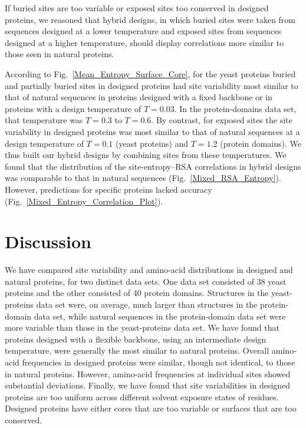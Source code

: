 \documentclass[12pt]{article}
\begin{document}
If buried sites are too variable or exposed sites too conserved in designed proteins, we reasoned that hybrid designs, in which buried sites were taken from sequences designed at a lower temperature and exposed sites from sequences designed at a higher temperature, should display correlations more similar to those seen in natural proteins. 

According to Fig.~\ref{Mean_Entropy_Surface_Core}, for the yeast proteins buried and partially buried sites in designed proteins had site variability most similar to that of natural sequences in proteins designed with a fixed backbone or in proteins with a design temperature of $T=0.03$. In the protein-domains data set, that temperature was $T=0.3$ to $T = 0.6$.  By contrast, for exposed sites the site variability in designed proteins was most similar to that of natural sequences at a design temperature of $T= 0.1$ (yeast proteins) and $T  = 1.2$ (protein domains).  We thus built our hybrid designs by combining sites from these temperatures. We found that the distribution of the site-entropy--RSA correlations in hybrid designs was comparable to that in natural sequences (Fig.~\ref{Mixed_RSA_Entropy}). However, predictions for specific proteins lacked accuracy (Fig.~\ref{Mixed_Entropy_Correlation_Plot}).

\section{Discussion}

We have compared site variability and amino-acid distributions in designed and natural proteins, for two distinct data sets. One data set consisted of 38 yeast proteins and the other consisted of 40 protein domains. Structures in the yeast-proteins data set were, on average, much larger than structures in the protein-domain data set, while natural sequences in the protein-domain data set were more variable than those in the yeast-proteins data set. We have found that proteins designed with a flexible backbone, using an intermediate design temperature, were generally the most similar to natural proteins. Overall amino-acid frequencies in designed proteins were similar, though not identical, to those in natural proteins. However, amino-acid frequencies at individual sites showed substantial deviations. Finally, we have found that site variabilities in designed proteins are too uniform across different solvent exposure states of residues. Designed proteins have either cores that are too variable or surfaces that are too conserved.
\end{document}
